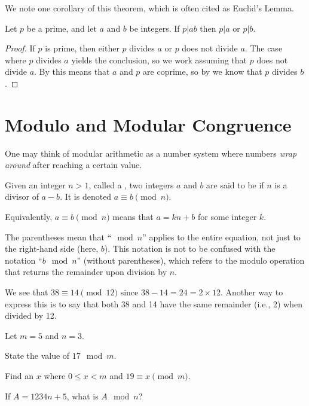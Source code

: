 We note one corollary of this theorem, which is often cited as Euclid's Lemma.

\begin{corollary}\label{corollary-euclid}
    Let $p$ be a prime, and let $a$ and $b$ be integers. If $p \vert ab$ then $p \vert a$ or $p \vert b$.
\end{corollary}
\begin{proof}
    If $p$ is prime, then either $p$ divides $a$ or $p$ does not divide $a$. The case where $p$ divides $a$ yields the conclusion, so we work assuming that $p$ does not divide $a$. By  this means that $a$ and $p$ are coprime, so by  we know that $p$ divides $b$.
\end{proof}

\section{Modulo and Modular Congruence}
One may think of modular arithmetic as a number system where numbers \textit{wrap around} after reaching a certain value.

\begin{definition}
    Given an integer $n>1$, called a , two integers $a$ and $b$ are said to be  if $n$ is a divisor of $a - b$. It is denoted $a \equiv b \pmod{n}$.
\end{definition}
\begin{remark}
    Equivalently, $a \equiv b \pmod n$ means that $a = kn + b$ for some integer $k$.
\end{remark}
\begin{remark}
    The parentheses mean that ``$\mod{n}$'' applies to the entire equation, not just to the right-hand side (here, $b$). This notation is not to be confused with the notation ``$b \mod n$'' (without parentheses), which refers to the modulo operation that returns the remainder upon division by $n$.
\end{remark}
\begin{example}
    We see that $38 \equiv 14 \pmod{12}$ since $38 - 14 = 24 = 2 \times 12$. Another way to express this is to say that both 38 and 14 have the same remainder (i.e., 2) when divided by 12.
\end{example}

\begin{exercise}
    Let $m = 5$ and $n = 3$.
    \begin{partquestions}{\alph*}
        \item State the value of $17 \mod m$.
        \item Find an $x$ where $0 \leq x < m$ and $19 \equiv x \pmod m$.
        \item If $A = 1234n + 5$, what is $A \mod n$?
    \end{partquestions}
\end{exercise}

